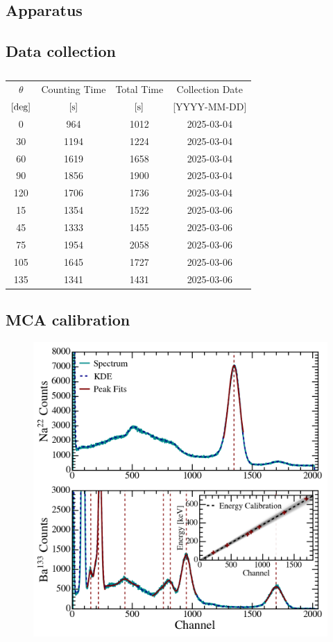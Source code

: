 \documentclass[aps,twocolumn,secnumarabic,balancelastpage,amsmath,amssymb,nofootinbib,floatfix]{revtex4-1}
\begin{document}
\subsection{Apparatus}
\label{ssec:apparatus}

\subsection{Data collection}
\label{ssec:data_collection}

\begin{table}
    \centering
    \addtolength{\tabcolsep}{3pt}
    \def\arraystretch{1.2}
    \begin{tabular}{c c c c}
        \hline
        $\theta$ & Counting Time & Total Time & Collection Date \\ [0ex]
        $[\rm{deg}]$ & $[\rm{s}]$ & $[\rm{s}]$ & [YYYY-MM-DD] \\ [1ex]
        \hline\hline

        0 & 964 & 1012 & 2025-03-04 \\
        30 & 1194 & 1224 & 2025-03-04 \\
        60 & 1619 & 1658 & 2025-03-04 \\
        90 & 1856 & 1900 & 2025-03-04 \\
        120 & 1706 & 1736 & 2025-03-04 \\
        15 & 1354 & 1522 & 2025-03-06 \\
        45 & 1333 & 1455 & 2025-03-06 \\
        75 & 1954 & 2058 & 2025-03-06 \\
        105 & 1645 & 1727 & 2025-03-06 \\
        135 & 1341 & 1431 & 2025-03-06 \\
        
        \hline
        
    \end{tabular}
    \caption{}
    \label{tab:data_collection}    
\end{table}

\subsection{MCA calibration}
\label{ssec:calibration}

\begin{figure}
    \centering
    \includegraphics[width=0.49 \textwidth]{Figures/energy_calibration.png}
    \caption{}
    \label{fig:energy_calibration}
\end{figure}
\end{document}
